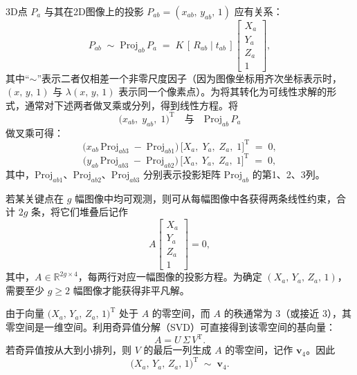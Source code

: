 3D点 $P_a$ 与其在2D图像上的投影 $P_{ab} = (x_{ab},\,y_{ab},\,1)$ 应有关系：
\begin{equation}
	P_{ab} 
	\;\sim\; 
	\mathrm{Proj}_{ab}\,P_a
	\;=\;
	K\,[\,R_{ab}\mid t_{ab}\,] 
	\begin{bmatrix}
		X_a\\[4pt]
		Y_a\\[4pt]
		Z_a\\[4pt]
		1
	\end{bmatrix},
\end{equation}
其中“$\sim$”表示二者仅相差一个非零尺度因子（因为图像坐标用齐次坐标表示时，$(x,\,y,\,1)$ 与 $\lambda(x,\,y,\,1)$ 表示同一个像素点）。为将其转化为可线性求解的形式，通常对下述两者做叉乘或分列，得到线性方程。将
\begin{equation}
	\bigl(x_{ab},\;y_{ab},\;1\bigr)^\mathrm{T}
	\quad\text{与}\quad 
	\mathrm{Proj}_{ab}\,P_a
\end{equation}
做叉乘可得：
\begin{equation}
	\bigl(x_{ab}\,\mathrm{Proj}_{ab3} \;-\; \mathrm{Proj}_{ab1}\bigr)\,\bigl[X_a,\;Y_a,\;Z_a,\;1\bigr]^\mathrm{T} \;=\; 0,
\end{equation}
\begin{equation}
	\bigl(y_{ab}\,\mathrm{Proj}_{ab3} \;-\; \mathrm{Proj}_{ab2}\bigr)\,\bigl[X_a,\;Y_a,\;Z_a,\;1\bigr]^\mathrm{T} \;=\; 0,
\end{equation}
其中，$\mathrm{Proj}_{ab1}$、$\mathrm{Proj}_{ab2}$、$\mathrm{Proj}_{ab3}$ 分别表示投影矩阵 $\mathrm{Proj}_{ab}$ 的第1、2、3列。

若某关键点在 $g$ 幅图像中均可观测，则可从每幅图像中各获得两条线性约束，合计 $2g$ 条，将它们堆叠后记作
\begin{equation}\label{eq:Aeq0}
	A 
	\begin{bmatrix}
		X_a\\[3pt]
		Y_a\\[3pt]
		Z_a\\[3pt]
		1
	\end{bmatrix}
	=
	0,
\end{equation}
其中，$A \in \mathbb{R}^{2g\times 4}$，每两行对应一幅图像的投影方程。为确定 \((X_a,\,Y_a,\,Z_a,\,1)\)，需要至少 \(g \ge 2\) 幅图像才能获得非平凡解。

由于向量 \(\bigl(X_a,\,Y_a,\,Z_a,\,1\bigr)^{\mathrm{T}}\) 处于 \(A\) 的零空间，而 \(A\) 的秩通常为 3（或接近 3），其零空间是一维空间。利用奇异值分解（SVD）可直接得到该零空间的基向量：
\begin{equation}
	A = U\,\Sigma\,V^\mathrm{T}.
\end{equation}
若奇异值按从大到小排列，则 \(V\) 的最后一列生成 \(A\) 的零空间，记作 \(\mathbf{v}_4\)。因此
\begin{equation}
	\bigl(X_a,\,Y_a,\,Z_a,\,1\bigr)^\mathrm{T}
	\;\sim\;
	\mathbf{v}_4.
\end{equation}

